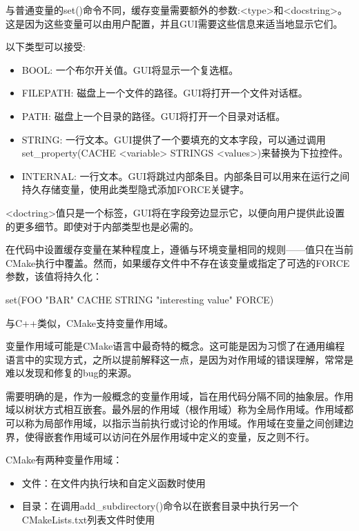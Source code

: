与普通变量的set()命令不同，缓存变量需要额外的参数:<type>和<docstring>。这是因为这些变量可以由用户配置，并且GUI需要这些信息来适当地显示它们。

以下类型可以接受:

\begin{itemize}
\item
BOOL: 一个布尔开关值。GUI将显示一个复选框。

\item
FILEPATH: 磁盘上一个文件的路径。GUI将打开一个文件对话框。

\item
PATH: 磁盘上一个目录的路径。GUI将打开一个目录对话框。

\item
STRING: 一行文本。GUI提供了一个要填充的文本字段，可以通过调用set\_property(CACHE <variable> STRINGS <values>)来替换为下拉控件。

\item
INTERNAL: 一行文本。GUI将跳过内部条目。内部条目可以用来在运行之间持久存储变量，使用此类型隐式添加FORCE关键字。
\end{itemize}

<doctring>值只是一个标签，GUI将在字段旁边显示它，以便向用户提供此设置的更多细节。即使对于内部类型也是必需的。

在代码中设置缓存变量在某种程度上，遵循与环境变量相同的规则——值只在当前CMake执行中覆盖。然而，如果缓存文件中不存在该变量或指定了可选的FORCE参数，该值将持久化：

\begin{cmake}
set(FOO "BAR" CACHE STRING "interesting value" FORCE)
\end{cmake}

与C++类似，CMake支持变量作用域。


变量作用域可能是CMake语言中最奇特的概念。这可能是因为习惯了在通用编程语言中的实现方式，之所以提前解释这一点，是因为对作用域的错误理解，常常是难以发现和修复的bug的来源。

需要明确的是，作为一般概念的变量作用域，旨在用代码分隔不同的抽象层。作用域以树状方式相互嵌套。最外层的作用域（根作用域）称为全局作用域。作用域都可以称为局部作用域，以指示当前执行或讨论的作用域。作用域在变量之间创建边界，使得嵌套作用域可以访问在外层作用域中定义的变量，反之则不行。

CMake有两种变量作用域：

\begin{itemize}
\item
文件：在文件内执行块和自定义函数时使用

\item
目录：在调用add\_subdirectory()命令以在嵌套目录中执行另一个CMakeLists.txt列表文件时使用
\end{itemize}

